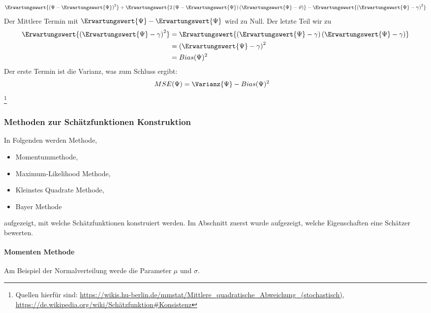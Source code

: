 \begin{align}
	\Erwartungswert{
		\left(\Psi - \Erwartungswert{\Psi}\right)^2
	}
	+
	\Erwartungswert{ 
		2\left(\Psi - \Erwartungswert{\Psi}\right)
		\left(\Erwartungswert{\Psi} - \vartheta \right) 
	}
	-
	\Erwartungswert{ 
		\left(\Erwartungswert{\Psi} - \gamma \right)^2
	}
\end{align}
Der Mittlere Termin mit $\Erwartungswert{\Psi} - \Erwartungswert{\Psi}$ wird zu Null. Der letzte Teil wir zu
\begin{align}
	\Erwartungswert{\left(\Erwartungswert{\Psi} - \gamma \right)^2} &=
	\Erwartungswert{
		\left(\Erwartungswert{\Psi} - \gamma \right)
		\left(\Erwartungswert{\Psi} - \gamma \right)
	}\\
	&= \left(\Erwartungswert{\Psi} - \gamma \right)^2\\
	&= Bias(\Psi)^2
\end{align}
Der erste Termin ist die Varianz, was zum Schluss ergibt:
\begin{align}
	MSE(\Psi) & = 	\Varianz{\Psi} - Bias(\Psi)^2
\end{align}
\footnote{Quellen hierfür sind: \href{Uni Berlin}{https://wikis.hu-berlin.de/mmstat/Mittlere_quadratische_Abweichung_(stochastisch)}, \href{Schätzfunktion}{https://de.wikipedia.org/wiki/Schätzfunktion#Konsistenz}}

\subsubsection{Methoden zur Schätzfunktionen Konstruktion}

In Folgenden werden Methode,
\begin{itemize}
	\item Momentummethode,
	\item Maximum-Likelihood Methode,
	\item Kleinstes Quadrate Methode,
	\item Bayer Methode
\end{itemize}
aufgezeigt, mit welche Schätzfunktionen konstruiert werden. Im Abschnitt zuerst wurde aufgezeigt, welche Eigenschaften eine Schätzer bewerten.


\paragraph{Momenten Methode}
Am Beispiel der Normalverteilung werde die Parameter $\mu$ und $\sigma$. 